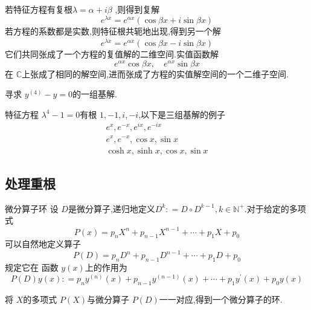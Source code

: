 \documentclass[lang=cn,12pt,color=green,fontset=none]{elegantbook}
\begin{document}
\begin{proposition}
    若特征方程有复根\(  \lambda=\alpha+ i\beta  \) ,则得到复解 \[
    e^{\lambda x} = e^{\alpha x}\left( \cos \beta x+  i\sin \beta x \right) 
    \]若方程的系数都是实数,则特征根共轭地出现,得到另一个解 \[
    e^{\overline{\lambda}x}= e^{ \alpha x}\left( \cos \beta x- i\sin  \beta x \right) 
    \]
    它们共同张成了一个方程的复值解的二维空间.实值函数解 \[
e^{\alpha x}\cos \beta x,\quad e^{ \alpha x}\sin  \beta x
\]在 \(  \mathbb{C}  \)上张成了相同的解空间,进而张成了方程的实值解空间的一个二维子空间.
\end{proposition}

\begin{example}
    寻求 \(  y^{\left( 4 \right) }-y=0  \)的一组基解. 
\end{example}

\begin{solution}
    特征方程 \(   \lambda ^{4}-1=0  \)有根 \(  1,-1,i,-i  \),以下是三组基解的例子 \[
  \begin{aligned}
    e^{x},e^{-x},e^{ix},e^{-ix}\\ 
     e^{x},e^{-x},\cos x,\sin x\\ 
      \cosh x,\sinh x,\cos x,\sin x 
  \end{aligned}
    \]  
\end{solution}

\subsection{处理重根}

\begin{definition}{微分算子环}
    设 \(  D  \)是微分算子,递归地定义\(  D^{k}: = D\circ D^{k-1}, k \in \mathbb{N} ^{+ }   \).对于给定的多项式 \[
    P\left( x \right)=p_{n}X^{n} + p_{n-1}X^{n-1}+ \cdots + p_1X+ p_0
    \]  可以自然地定义算子 \[
    P\left( D \right)= p_{n}D^{n}+ p_{n-1}D^{n-1}+ \cdots + p_1D+ p_0 
    \]规定它在 函数 \(  y\left( x \right)   \)上的作用为 \[
    P\left( D \right)y\left( x \right): = p_{n}y^{\left( n \right) }\left( x \right)+ p_{n-1}y^{\left( n-1 \right) }\left( x \right)+ \cdots + p_1y^{\prime} \left( x \right)+ p_0y\left( x \right)      
    \] 
\end{definition}

\begin{remark}
    将 \(  X  \)的多项式 \(  P\left( X \right)   \)与微分算子 \(  P\left( D \right)   \)一一对应,得到一个微分算子的环.   
\end{remark}
\end{document}
